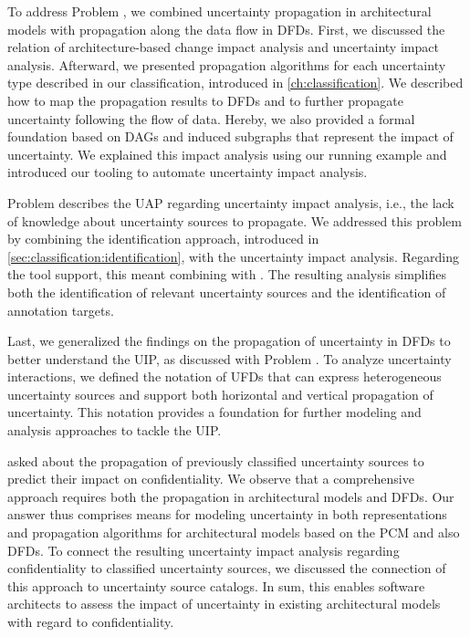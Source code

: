 To address Problem , we combined uncertainty propagation in architectural models with propagation along the data flow in \acp{DFD}.
First, we discussed the relation of architecture-based change impact analysis \cite{busch_architecture-based_2020} and uncertainty impact analysis.
Afterward, we presented propagation algorithms for each uncertainty type described in our classification, introduced in \autoref{ch:classification}.
We described how to map the propagation results to \acp{DFD} and to further propagate uncertainty following the flow of data.
Hereby, we also provided a formal foundation based on \acp{DAG} and induced subgraphs that represent the impact of uncertainty.
We explained this impact analysis using our running example and introduced our tooling \uia to automate uncertainty impact analysis.

Problem  describes the \ac{UAP} regarding uncertainty impact analysis, i.e., the lack of knowledge about uncertainty sources to propagate.
We addressed this problem by combining the identification approach, introduced in \autoref{sec:classification:identification}, with the uncertainty impact analysis.
Regarding the tool support, this meant combining \arcen with \uia.
The resulting analysis simplifies both the identification of relevant uncertainty sources and the identification of annotation targets.

Last, we generalized the findings on the propagation of uncertainty in \acp{DFD} to better understand the \ac{UIP}, as discussed with Problem .
To analyze uncertainty interactions, we defined the notation of \acp{UFD} that can express heterogeneous uncertainty sources and support both horizontal and vertical propagation of uncertainty. 
This notation provides a foundation for further modeling and analysis approaches to tackle the \ac{UIP}.

 asked about the propagation of previously classified uncertainty sources to predict their impact on confidentiality.
We observe that a comprehensive approach requires both the propagation in architectural models and \acp{DFD}.
Our answer thus comprises means for modeling uncertainty in both representations and propagation algorithms for architectural models based on the \ac{PCM} and also \acp{DFD}.
To connect the resulting uncertainty impact analysis regarding confidentiality to classified uncertainty sources, we discussed the connection of this approach to uncertainty source catalogs.
In sum, this enables software architects to assess the impact of uncertainty in existing architectural models with regard to confidentiality.


